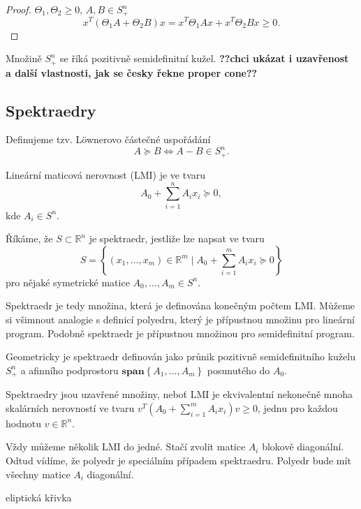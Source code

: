 \begin{proof}
    $\Theta_1, \Theta_2 \geq 0$, $A, B \in S_+^n$
    $$
        x^T \left( \Theta_1 A + \Theta_2 B \right) x = x^T \Theta_1 A x + x^T \Theta_2 B x \geq 0.
    $$
\end{proof}

Množině $S_+^n$ se říká pozitivně semidefinitní kužel. \textbf{??chci ukázat i uzavřenost a další vlastnosti, jak se česky řekne proper cone??}

\subsection*{Spektraedry}

Definujeme tzv. L\"{o}wnerovo částečné uspořádání
$$
    A \succeq B \iff A - B \in S_+^n.
$$

\begin{df}
    Lineární maticová nerovnost (LMI) je ve tvaru
    $$
        A_0 + \sum_{i=1}^n A_i x_i \succeq 0,
    $$
    kde $A_i \in S^n$.
\end{df}

\begin{df}
    Říkáme, že $S \subset \mathbb{R}^n$ je spektraedr, jestliže lze napsat ve tvaru
    $$
        S = \left\{ (x_1, \dots, x_m) \in \mathbb{R}^m \mid A_0 + \sum_{i=1}^m A_i x_i \succeq 0 \right\}
    $$
    pro nějaké symetrické matice $A_0, \dots, A_m \in S^n$.
\end{df}

Spektraedr je tedy množina, která je definována konečným počtem LMI. Můžeme si všimnout analogie s definicí polyedru, který je přípustnou množinu pro lineární program. Podobně spektraedr je přípustnou množinou pro semidefinitní program.

Geometricky je spektraedr definován jako průnik pozitivně semidefinitního kuželu $S_+^n$ a afinního podprostoru $\textbf{span}\left\{ A_1, \dots, A_m \right\}$ posunutého do $A_0$.

Spektraedry jsou uzavřené množiny, neboť LMI je ekvivalentní nekonečně mnoha skalárních nerovností ve tvaru $v^T(A_0 + \sum_{i=1}^m A_ix_i)v \geq 0$, jednu pro každou hodnotu $v \in \mathbb{R}^n$.

Vždy můžeme několik LMI  do jedné. Stačí zvolit matice $A_i$ blokově diagonální. Odtud vídíme, že polyedr je speciálním případem spektraedru. Polyedr bude mít všechny matice $A_i$ diagonální.

\begin{pr}
    eliptická křivka
\end{pr}


